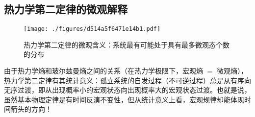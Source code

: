 \subsection{热力学第二定律的微观解释}
\begin{figure}[ht]
\centering
\texttt{[image: ./figures/d514a5f6471e14b1.pdf]}
\caption{热力学第二定律的微观含义：系统最有可能处于具有最多微观态个数的分布} \label{fig_Td2Law_4}
\end{figure}
由于热力学熵和玻尔兹曼熵之间的关系（在热力学极限下，宏观熵 $=$ 微观熵），热力学第二定律有其统计意义：孤立系统的自发过程（不可逆过程）总是从有序向无序过渡，即从出现概率小的宏观状态向出现概率大的宏观状态过渡。也就是说，虽然基本物理定律是有时间反演不变性，但从统计意义上看，宏观规律却能体现时间箭头的方向！

